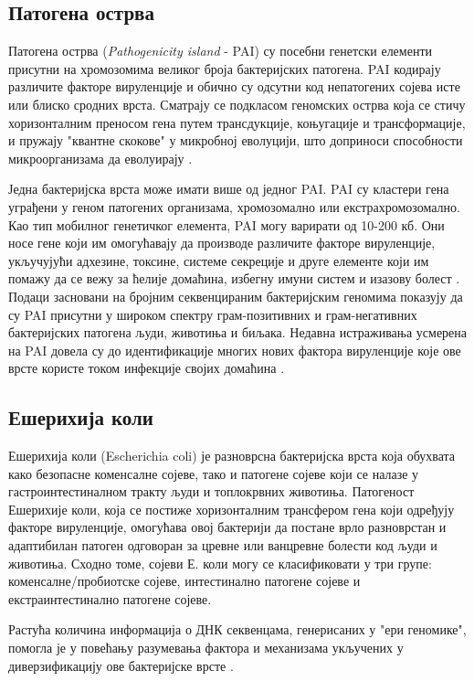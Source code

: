 \documentclass[12pt]{article}
\begin{document}
\subsection{Патогена острва}

Патогена острва (\textit{Pathogenicity island} - PAI) су посебни генетски елементи присутни на хромозомима великог броја бактеријских патогена. PAI кодирају различите факторе вируленције и обично су одсутни код непатогених сојева исте или блиско сродних врста. Сматрају се подкласом геномских острва која се стичу хоризонталним преносом гена путем трансдукције, коњугације и трансформације, и пружају "квантне скокове" у микробној еволуцији, што доприноси способности микроорганизама да еволуирају \cite{Gal-Mor2006-dv}. 

Једна бактеријска врста може имати више од једног PAI. PAI су кластери гена уграђени у геном патогених организама, хромозомално или екстрахромозомално. Као тип мобилног генетичког елемента, PAI могу варирати од 10-200 кб. Они носе гене који им омогућавају да производе различите факторе вируленције, укључујући адхезине, токсине, системе секреције и друге елементе који им помажу да се вежу за ћелије домаћина, избегну имуни систем и изазову болест \cite{Schmidt2004-xj}. Подаци засновани на бројним секвенцираним бактеријским геномима показују да су PAI присутни у широком спектру грам-позитивних и грам-негативних бактеријских патогена људи, животиња и биљака. Недавна истраживања усмерена на PAI довела су до идентификације многих нових фактора вируленције које ове врсте користе током инфекције својих домаћина \cite{Gal-Mor2006-dv}.

\subsection{Ешерихија коли}

Ешерихија коли (Escherichia coli) је разноврсна бактеријска врста која обухвата како безопасне коменсалне сојеве, тако и патогене сојеве који се налазе у гастроинтестиналном тракту људи и топлокрвних животиња. Патогеност Ешерихије коли, која се постиже хоризонталним трансфером гена који одређују факторе вируленције, омогућава овој бактерији да постане врло разноврстан и адаптибилан патоген одговоран за цревне или ванцревне болести код људи и животиња. Сходно томе, сојеви Е. коли могу се класификовати у три групе: коменсалне/пробиотске сојеве, интестинално патогене сојеве и екстраинтестинално патогене сојеве.

Растућа количина информација о ДНК секвенцама, генерисаних у "ери геномике", помогла је у повећању разумевања фактора и механизама укључених у диверзификацију ове бактеријске врсте \cite{Desvaux2020-mx}. 
\end{document}
